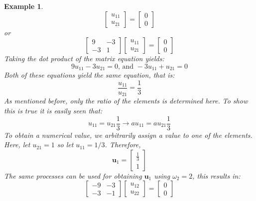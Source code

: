 \documentclass[12pt,letter]{article}
\newtheorem{ex}{Example}
\numberwithin{ex}{section} %
\newenvironment{example}{\begin{mdframed}[middlelinewidth=0.5mm]\begin{ex}\normalfont}{\end{ex}\end{mdframed}}
\numberwithin{re}{section} %
\begin{document}
\begin{example}
\begin{equation}
	 \begin{bmatrix} u_{11}\\ u_{21}\end{bmatrix}=\begin{bmatrix} 0\\ 0\end{bmatrix}
\end{equation}
or
\begin{equation}
	 \begin{bmatrix} 9 & -3 \\    -3  & 1 \end{bmatrix} 
	 \begin{bmatrix} u_{11}\\ u_{21}\end{bmatrix}=\begin{bmatrix} 0\\ 0\end{bmatrix}
\end{equation}
Taking the dot product of the matrix equation yields:
\begin{equation}
	9u_{11} -3u_{21}=0 \text{, and } -3u_{11} + u_{21}=0
\end{equation}
Both of these equations yield the same equation, that is:
\begin{equation}
	\frac{u_{11}}{u_{21}} =\frac{1}{3}
\end{equation}
As mentioned before, only the ratio of the elements is determined here. To show this is true it is easily seen that:
\begin{equation}
	u_{11}=u_{21}\frac{1}{3} \rightarrow  a u_{11}= a u_{21}\frac{1}{3} 
\end{equation}
To obtain a numerical value, we arbitrarily assign a value to one of the elements. Here, let $u_{21}=1$ so  let $u_{11}=1/3$. Therefore, 
\begin{equation}
	 \textbf{u}_1 = \begin{bmatrix} \frac{1}{3}\\ 1\end{bmatrix}
\end{equation}
The same processes can be used for obtaining $\textbf{u}_1$ using $\omega_2=2$, this results in:
\begin{equation}
	 \begin{bmatrix} -9 & -3 \\    -3  & -1 \end{bmatrix} 
	 \begin{bmatrix} u_{12}\\ u_{22}\end{bmatrix}=\begin{bmatrix} 0\\ 0\end{bmatrix}

\end{equation}
\end{example}
\end{document}
